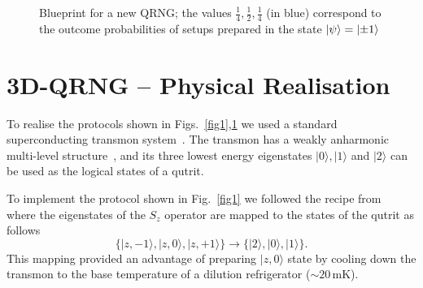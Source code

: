 \documentclass[l1pt]{elsarticle}
\begin{document}
{\begin{figure}
\caption{Blueprint for a new QRNG; the values $\frac{1}{4}, \frac{1}{2},\frac{1}{4}$ (in blue)  correspond to the outcome probabilities of setups prepared in the  state $\ket{\psi} = \ket{\pm 1}$}
\label{fig2}
\end{figure}

}

\section{3D-QRNG -- Physical Realisation}

\label{3dqrngphysicalrealisation}
To realise the protocols shown in  Figs.~\ref{fig1},\ref{fig2} we used a standard superconducting transmon system~\cite{PhysRevLett.119.240501}. The transmon has a weakly anharmonic multi-level structure~\cite{Koch2007}, and its three lowest energy eigenstates $|0\rangle, |1\rangle$ and $|2\rangle$ can be used as the logical states of a qutrit.

To implement the protocol shown in Fig.~\ref{fig1} we followed the recipe from~\cite{PhysRevLett.119.240501} where the eigenstates of the $S_z$ operator are mapped to the states of the qutrit as follows
\begin{equation}
\{|z,-1\rangle,|z,0\rangle,|z,+1\rangle\} \rightarrow \{|2\rangle,|0\rangle,|1\rangle\}.
\end{equation}
This mapping provided an advantage of preparing $|z,0\rangle$ state by cooling down the transmon to the base temperature of a dilution refrigerator ($\sim20\,$mK).
\end{document}
